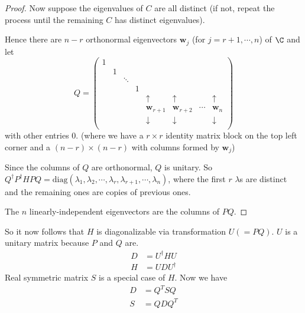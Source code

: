 \documentclass[a4paper]{article}
\begin{document}
\begin{proof}
        Now suppose the eigenvalues of $C$ are all distinct (if not, repeat the process until the remaining $C$ has distinct eigenvalues).

        Hence there are $n -r $ orthonormal eigenvectors $\mathbf{w}_j$ (for $j = r + 1, \cdots, n$) of $\C$ and let
        \[
          Q = 
          \begin{pmatrix}
            1 \\
            & 1\\
            && \ddots\\
            &&& 1\\
            &&&& \uparrow & \uparrow & &\uparrow\\
            &&&& \mathbf{w}_{r+1} & \mathbf{w}_{r + 2} & \cdots & \mathbf{w}_n\\
            &&&& \downarrow & \downarrow & &\downarrow\\
          \end{pmatrix}
        \]
        with other entries $0$. (where we have a $r\times r$ identity matrix block on the top left corner and a $(n - r) \times (n -r)$ with columns formed by $\mathbf{w}_j$)

        Since the columns of $Q$ are orthonormal, $Q$ is unitary. So $Q^\dagger P^\dagger HPQ = \mathrm{diag}(\lambda_1, \lambda_2, \cdots, \lambda_r, \lambda_{r + 1}, \cdots, \lambda_n)$, where the first $r$ $\lambda$s are distinct and the remaining ones are copies of previous ones.

        The $n$ linearly-independent eigenvectors are the columns of $PQ$.

      \end{proof}
      So it now follows that $H$ is diagonalizable via transformation $U (=PQ)$. $U$ is a unitary matrix because $P$ and $Q$ are.
      \begin{align*}
        D &= U^\dagger HU\\
        H &= UDU^\dagger
      \end{align*}
      Real symmetric matrix $S$ is a special case of $H$. Now we have
      \begin{align*}
        D &= Q^T SQ\\
        S &= QDQ^T
      \end{align*}
\end{document}
